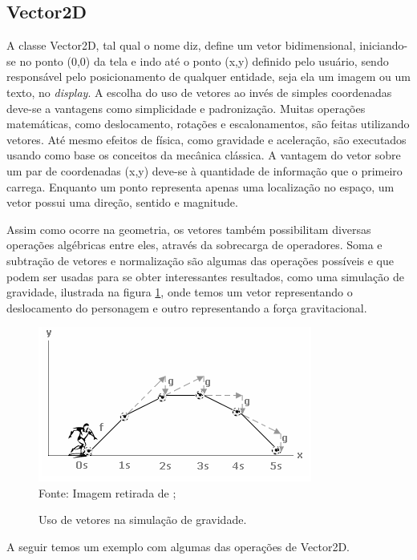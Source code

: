 \subsection{Vector2D}
%
%
A classe Vector2D, tal qual o nome diz, define um vetor bidimensional, iniciando-se no ponto (0,0) da tela e indo até o ponto (x,y) definido pelo usuário, sendo responsável pelo posicionamento de qualquer entidade, seja ela um imagem ou um texto, no \textit{display}. A escolha do uso de vetores ao invés de simples coordenadas deve-se a vantagens como simplicidade e padronização. Muitas operações matemáticas, como deslocamento, rotações e escalonamentos, são feitas utilizando vetores. Até mesmo efeitos de física, como gravidade e aceleração, são executados usando como base os conceitos da mecânica clássica. A vantagem do vetor sobre um par de coordenadas (x,y) deve-se à quantidade de informação que o primeiro carrega. Enquanto um ponto representa apenas uma localização no espaço, um vetor possui uma direção, sentido e magnitude. 
\par 
Assim como ocorre na geometria, os vetores também possibilitam diversas operações algébricas entre eles, através da sobrecarga de operadores. Soma e subtração de vetores e normalização são algumas das operações possíveis e que podem ser usadas para se obter interessantes resultados, como uma simulação de gravidade, ilustrada na figura \ref{VetorGravidade}, onde temos um vetor representando o deslocamento do personagem e outro representando a força gravitacional.
%
%
%
\begin{figure}[H]
    \centering
    \caption{Uso de vetores na simulação de gravidade.}
    \label{VetorGravidade}
    \includegraphics[scale = 0.8]{Imagens/VetorGravidade.png}
    \\Fonte: Imagem retirada de \cite{PontoV};
\end{figure}
%
%
A seguir temos um exemplo com algumas das operações de Vector2D.
%

%
%
